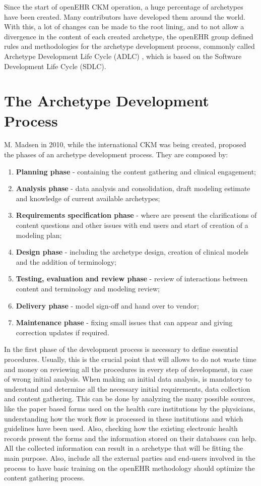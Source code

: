\documentclass[mim_thesis.tex]{subfiles}
\begin{document}
Since the start of openEHR CKM operation, a huge percentage of archetypes have been created. Many contributors have developed them around the world. With this, a lot of changes can be made to the root lining, and to not allow a divergence in the content of each created archetype, the openEHR group defined rules and methodologies for the archetype development process, commonly called Archetype Development Life Cycle (ADLC) \citep{Madsen2010}, which is based on the Software Development Life Cycle (SDLC).


\section{The Archetype Development Process}

M. Madsen in 2010, while the international CKM was being created, proposed the phases of an archetype development process. They are composed by:

\begin{enumerate}[noitemsep]
\item \textbf{Planning phase} - containing the content gathering and clinical engagement;
\item \textbf{Analysis phase} - data analysis and consolidation, draft modeling estimate and knowledge of current available archetypes;
\item \textbf{Requirements specification phase} - where are present the clarifications of content questions and other issues with end users and start of creation of a modeling plan;
\item \textbf{Design phase} - including the archetype design, creation of clinical models and the addition of terminology;
\item \textbf{Testing, evaluation and review phase} - review of interactions between content and terminology and modeling review;
\item \textbf{Delivery phase} - model sign-off and hand over to vendor;
\item \textbf{Maintenance phase} - fixing small issues that can appear and giving correction updates if required.
\end{enumerate}

In the first phase of the development process is necessary to define essential procedures. Usually, this is the crucial point that will allows to do not waste time and money on reviewing all the procedures in every step of development, in case of wrong initial analysis. When making an initial data analysis, is mandatory to understand and determine all the necessary initial requirements, data collection and content gathering. This can be done by analyzing the many possible sources, like the paper based forms used on the health care institutions by the physicians, understanding how the work flow is processed in these institutions and which guidelines have been used. Also, checking how the existing electronic health records present the forms and the information stored on their databases can help. All the collected information can result in a archetype that will be fitting the main purpose. Also, include all the external parties and end-users involved in the process to have basic training on the openEHR methodology should optimize the content gathering process.
  
\end{document}
